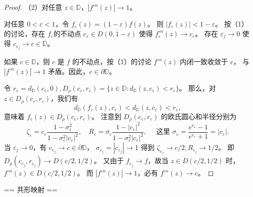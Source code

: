 \begin{proof}
（2）对任意 $z \in \mathbb{D}$，$|f^{\circ n}(z)| \rightarrow 1$。

对任意 $0<\varepsilon<1$，令 $f_{\varepsilon}(z)=(1-\varepsilon) f(z)$。
则 $|f_{\varepsilon}(z)|<1-\varepsilon$。
按（1）的讨论，存在 $f_{\varepsilon}$的不动点 $c_{\varepsilon} \in \overline{D(0,1-\varepsilon)}$ 
使得 $f_{\varepsilon}^{\circ n}(z) \rightarrow c_{\varepsilon}$。
存在 $\varepsilon_j \rightarrow 0$ 使得 $c_{\varepsilon_j} \rightarrow c \in \overline{\mathbb{D}}$。

如果 $c \in \mathbb{D}$，则 $c$ 是 $f$ 的不动点，按（1）的讨论 $f^{\circ n}(z)$ 内闭一致收敛于 $c$，
与 $|f^{\circ n}(z)| \rightarrow 1$ 矛盾。因此，$c \in \partial \mathbb{D}$。

令 $r_{\varepsilon}=d_{\mathbb{D}}(c_{\varepsilon}, 0), 
D_\rho(c_{\varepsilon}, r_{\varepsilon})=\{z \in \mathbb{D}: d_{\mathbb{D}}(z, c_{\varepsilon})<r_{\varepsilon}\}$。
那么，对 $z \in D_\rho(c_{\varepsilon}, r_{\varepsilon})$，我们有
$$d_{\mathbb{D}}(f_{\varepsilon}(z), c_{\varepsilon})
<d_{\mathbb{D}}(z, c_{\varepsilon})<r_{\varepsilon},$$
意味着 $f_{\varepsilon}(z) \in D_\rho(c_{\varepsilon}, r_{\varepsilon})$。
注意到 $D_\rho(c_{\varepsilon}, r_{\varepsilon})$ 的欧氏圆心和半径分别为
$$\zeta_{\varepsilon}=c_{\varepsilon} \frac{1-\sigma_{\varepsilon}^2}{1-\sigma_{\varepsilon}^2|c_{\varepsilon}|^2}, 
\quad R_{\varepsilon}=\sigma_{\varepsilon} \frac{1-|c_{\varepsilon}|^2}{1-\sigma_{\varepsilon}^2|c_{\varepsilon}|^2}, 
\quad \text { 这里 } \sigma_{\varepsilon}=\frac{e^{r_{\varepsilon}}-1}{e^{r_{\varepsilon}}+1}=|c_{\varepsilon}|.$$
当 $\varepsilon_j \rightarrow 0$，有 $c_{\varepsilon_j} \rightarrow c \in \partial \mathbb{D}$，
$\sigma_{\varepsilon_j}=|c_{\varepsilon_j}| \rightarrow 1$ 得到 $\zeta_{\varepsilon_j} \rightarrow c/2, R_{\varepsilon_j} \rightarrow 1/2$。
即 $D_\rho(c_{\varepsilon_j}, r_{\varepsilon_j}) \rightarrow D(c/2,1/2)$。
又由于 $f_{\varepsilon_j} \rightarrow f$，故当 $z \in D(c/2,1/2)$ 时，$f^{\circ n}(z) \in D(c/2,1/2)$。
而 $|f^{\circ n}(z)| \rightarrow 1$，必有 $f^{\circ n}(z) \rightarrow c$。
\end{proof}

== 共形映射 ==

